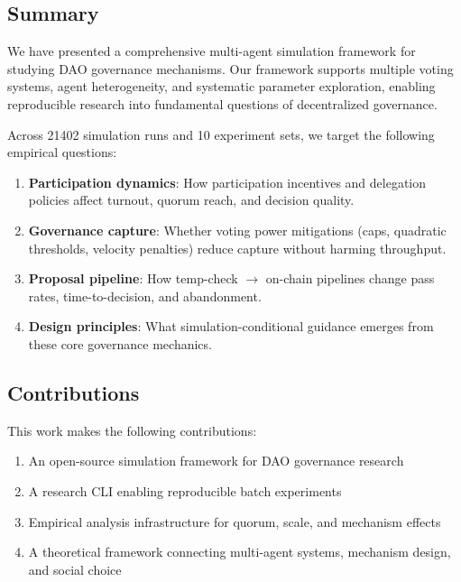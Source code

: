 
\subsection{Summary}

We have presented a comprehensive multi-agent simulation framework for studying DAO governance mechanisms. Our framework supports multiple voting systems, agent heterogeneity, and systematic parameter exploration, enabling reproducible research into fundamental questions of decentralized governance.

Across 21402 simulation runs and 10 experiment sets, we target the following empirical questions:

\begin{enumerate}
    \item \textbf{Participation dynamics}: How participation incentives and delegation policies affect turnout, quorum reach, and decision quality.

    \item \textbf{Governance capture}: Whether voting power mitigations (caps, quadratic thresholds, velocity penalties) reduce capture without harming throughput.

    \item \textbf{Proposal pipeline}: How temp-check $\rightarrow$ on-chain pipelines change pass rates, time-to-decision, and abandonment.

    \item \textbf{Design principles}: What simulation-conditional guidance emerges from these core governance mechanics.
\end{enumerate}

\subsection{Contributions}

This work makes the following contributions:

\begin{enumerate}
    \item An open-source simulation framework for DAO governance research
    \item A research CLI enabling reproducible batch experiments
    \item Empirical analysis infrastructure for quorum, scale, and mechanism effects
    \item A theoretical framework connecting multi-agent systems, mechanism design, and social choice
\end{enumerate}

